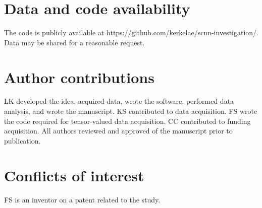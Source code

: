 \documentclass[10pt, letterpaper, oneside]{article}
\begin{document}
\newpage

\section*{Data and code availability}

The code is publicly available at \url{https://github.com/kerkelae/scnn-investigation/}. Data may be shared for a reasonable request.

\section*{Author contributions}

LK developed the idea, acquired data, wrote the software, performed data analysis, and wrote the manuscript. KS contributed to data acquisition. FS wrote the code required for tensor-valued data acquisition. CC contributed to funding acquisition. All authors reviewed and approved of the manuscript prior to publication.

\section*{Conflicts of interest}

FS is an inventor on a patent related to the study.

\newpage



\end{document}
